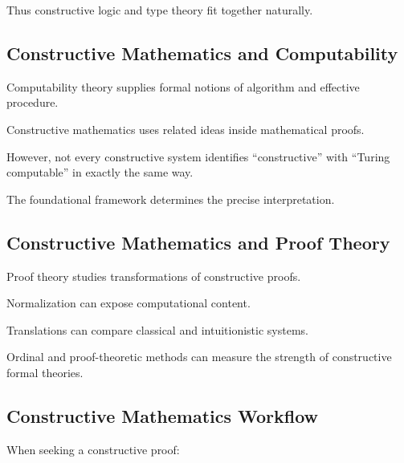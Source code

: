Thus constructive logic and type theory fit together naturally.

\subsection{Constructive Mathematics and Computability}
\label{subsec:constructive-mathematics-computability}

Computability theory supplies formal notions of algorithm and effective
procedure.

Constructive mathematics uses related ideas inside mathematical proofs.

However, not every constructive system identifies ``constructive'' with
``Turing computable'' in exactly the same way.

The foundational framework determines the precise interpretation.

\subsection{Constructive Mathematics and Proof Theory}
\label{subsec:constructive-mathematics-proof-theory}

Proof theory studies transformations of constructive proofs.

Normalization can expose computational content.

Translations can compare classical and intuitionistic systems.

Ordinal and proof-theoretic methods can measure the strength of constructive
formal theories.

\subsection{Constructive Mathematics Workflow}
\label{subsec:constructive-mathematics-workflow}

When seeking a constructive proof:

